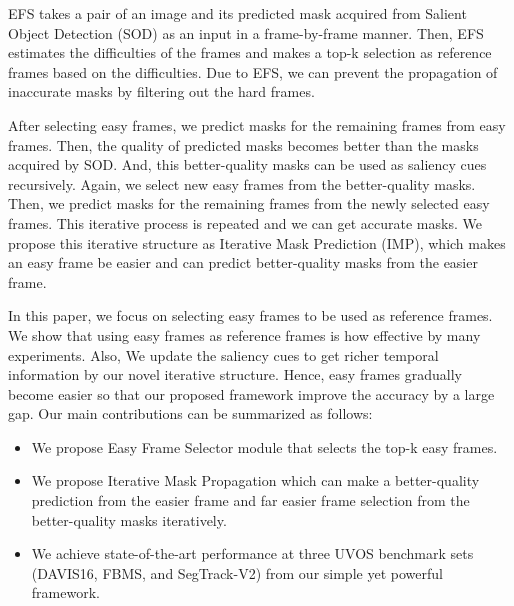 \documentclass[letterpaper]{article} \usepackage{aaai22}  \usepackage{times}  \usepackage{helvet}  \usepackage{courier}  \usepackage[hyphens]{url}  \usepackage{graphicx} \urlstyle{rm} \def\UrlFont{\rm}  \usepackage{natbib}  \usepackage{caption} \DeclareCaptionStyle{ruled}{labelfont=normalfont,labelsep=colon,strut=off} \frenchspacing  \setlength{\pdfpagewidth}{8.5in}  \setlength{\pdfpageheight}{11in}  \usepackage{algorithm}
\begin{document}
EFS takes a pair of an image and its predicted mask acquired from Salient Object Detection (SOD) as an input in a frame-by-frame manner. Then, EFS estimates the difficulties of the frames and makes a top-k selection as reference frames based on the difficulties. Due to EFS, we can prevent the propagation of inaccurate masks by filtering out the hard frames.

After selecting easy frames, we predict masks for the remaining frames from easy frames. 
Then, the quality of predicted masks becomes better than the masks acquired by SOD. And, this better-quality masks can be used as saliency cues recursively. Again, we select new easy frames from the better-quality masks. Then, we predict masks for the remaining frames from the newly selected easy frames. This iterative process is repeated and we can get accurate masks. We propose this iterative structure as Iterative Mask Prediction (IMP), which makes an easy frame be easier and can predict better-quality masks from the easier frame. 

In this paper, we focus on selecting easy frames to be used as reference frames. We show that using easy frames as reference frames is how effective by many experiments. Also, We update the saliency cues to get richer temporal information by our novel iterative structure. Hence, easy frames gradually become easier so that our proposed framework improve the accuracy by a large gap. Our main contributions can be summarized as follows:

\begin{itemize}
\item We propose Easy Frame Selector module that selects the top-k easy frames. 
\item We propose Iterative Mask Propagation which can make a better-quality prediction from the easier frame and far easier frame selection from the better-quality masks iteratively. 
\item We achieve state-of-the-art performance at three UVOS benchmark sets (DAVIS16, FBMS, and SegTrack-V2) from our simple yet powerful framework.
\end{itemize}
\end{document}

